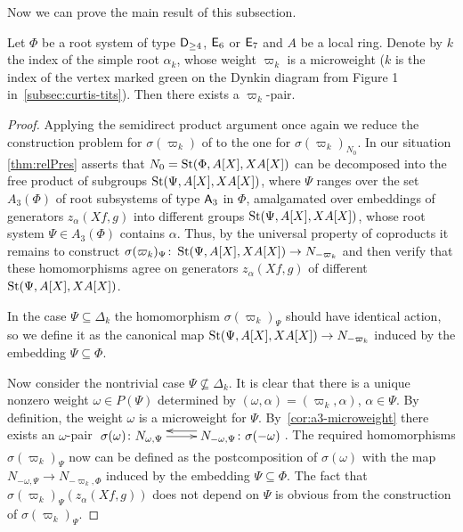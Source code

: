 Now we can prove the main result of this subsection.
\begin{thm} \label{thm:pairconstr}
    Let $\Phi$ be a root system of type $\mathsf{D}_{\geq 4}$, $\mathsf{E}_6$ or $\mathsf{E}_7$ and $A$ be a local ring.
    Denote by $k$ the index of the simple root $\alpha_k$, whose weight $\varpi_k$ is a microweight
     ($k$ is the index of the vertex marked green on the Dynkin diagram from Figure 1 in~\cref{subsec:curtis-tits}).
    Then there exists a $\varpi_k$-pair.
\end{thm}
\begin{proof}
    Applying the semidirect product argument once again we reduce the construction problem for $\sigma(\varpi_k)$ of to the one for $\sigma({\varpi_k})_{N_0}$.
    In our situation \cref{thm:relPres} asserts that $N_0 = \operatorname{St}(\Phi, A[X], XA[X])$ can be decomposed into the free product of subgroups $\operatorname{St}(\Psi, A[X], XA[X])$,
    where $\Psi$ ranges over the set $A_3(\Phi)$ of root subsystems of type $\mathsf{A}_3$ in $\Phi$, amalgamated over embeddings of generators $z_\alpha(Xf, g)$ into different groups $\operatorname{St}(\Psi, A[X], XA[X])$, whose root system $\Psi \in A_3(\Phi)$ contains $\alpha$.
    Thus, by the universal property of coproducts it remains to construct $\sigma(\varpi_k)_\Psi \colon \operatorname{St}(\Psi, A[X], XA[X]) \to N_{-\varpi_k}$ and then
    verify that these homomorphisms agree on generators $z_\alpha(Xf, g)$ of different $\operatorname{St}(\Psi, A[X], XA[X])$.

    In the case $\Psi \subseteq \Delta_k$ the homomorphism $\sigma(\varpi_k)_\Psi$ should have identical action, so we define it as the canonical map $\operatorname{St}(\Psi, A[X], XA[X]) \to N_{-\varpi_k}$
    induced by the embedding $\Psi \subseteq \Phi$.

    Now consider the nontrivial case $\Psi \not\subseteq \Delta_k$.
    It is clear that there is a unique nonzero weight $\omega \in P(\Psi)$ determined by $(\omega, \alpha) = (\varpi_k, \alpha)$, $\alpha \in \Psi$.
    By definition, the weight $\omega$ is a microweight for $\Psi$.
    By~\cref{cor:a3-microweight} there exists an $\omega$-pair $\xymatrix{ \sigma(\omega)\colon N_{\omega, \Psi} \ar[r] & \ar@<-1.0ex>[l] N_{-\omega, \Psi}\colon \sigma(-\omega) }$.
    The required homomorphisms $\sigma(\varpi_k)_\Psi$ now can be defined as the postcomposition of $\sigma(\omega)$ with the map $N_{-\omega, \Psi} \to N_{-\varpi_k, \Phi}$ induced by the embedding $\Psi \subseteq \Phi$.
    The fact that $\sigma(\varpi_k)_\Psi(z_\alpha(Xf, g))$ does not depend on $\Psi$ is obvious from the construction of $\sigma(\varpi_k)_\Psi$.
\end{proof}